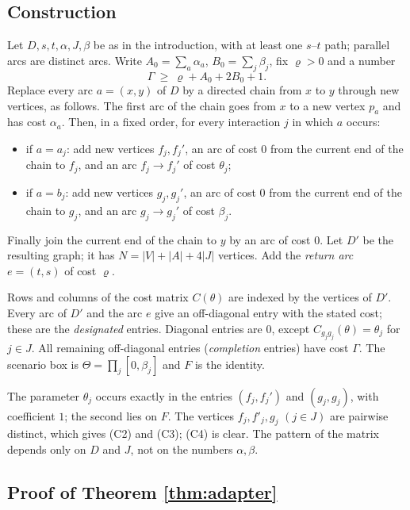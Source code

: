 \documentclass[11pt]{amsart}
\theoremstyle{plain}
\theoremstyle{definition}
\theoremstyle{remark}
\begin{document}
\subsection{Construction}
Let $D,s,t,\alpha,J,\beta$ be as in the introduction, with at least one $s$--$t$ path; parallel arcs are distinct
arcs. Write $A_0=\sum_a\alpha_a$, $B_0=\sum_j\beta_j$, fix $\varrho>0$ and a number
\begin{equation}\label{eq:Gamma}
 \Gamma\ \ge\ \varrho+A_0+2B_0+1 .
\end{equation}
Replace every arc $a=(x,y)$ of $D$ by a directed chain from $x$ to $y$ through new vertices, as follows. The first
arc of the chain goes from $x$ to a new vertex $p_a$ and has cost $\alpha_a$. Then, in a fixed order, for every
interaction $j$ in which $a$ occurs:
\begin{itemize}
\item if $a=a_j$: add new vertices $f_j,f_j'$, an arc of cost $0$ from the current end of the chain to $f_j$, and an
  arc $f_j\to f_j'$ of cost $\theta_j$;
\item if $a=b_j$: add new vertices $g_j,g_j'$, an arc of cost $0$ from the current end of the chain to $g_j$, and an
  arc $g_j\to g_j'$ of cost $\beta_j$.
\end{itemize}
Finally join the current end of the chain to $y$ by an arc of cost $0$. Let $D'$ be the resulting graph; it has
$N=|V|+|A|+4|J|$ vertices. Add the \emph{return arc} $e=(t,s)$ of cost $\varrho$.

Rows and columns of the cost matrix $C(\theta)$ are indexed by the vertices of $D'$. Every arc of $D'$ and the arc
$e$ give an off-diagonal entry with the stated cost; these are the \emph{designated} entries. Diagonal entries are
$0$, except $C_{g_jg_j}(\theta)=\theta_j$ for $j\in J$. All remaining off-diagonal entries (\emph{completion}
entries) have cost $\Gamma$. The scenario box is $\Theta=\prod_j[0,\beta_j]$ and $F$ is the identity.

The parameter $\theta_j$ occurs exactly in the entries $(f_j,f_j')$ and $(g_j,g_j)$, with coefficient $1$; the
second lies on $F$. The vertices $f_j,f'_j,g_j$ $(j\in J)$ are pairwise distinct, which gives (C2) and (C3); (C4) is
clear. The pattern of the matrix depends only on $D$ and $J$, not on the numbers $\alpha,\beta$.

\subsection{Proof of Theorem \ref{thm:adapter}}
\end{document}
